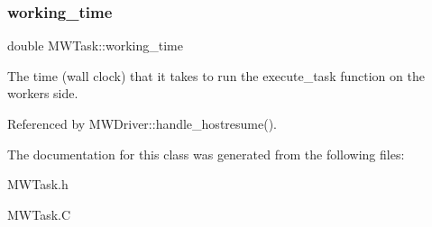 \mbox{\label{classMWTask_ae503d6480ef81dcc1ccd7927e4655226}} 
\subsubsection{\texorpdfstring{working\+\_\+time}{working\_time}}
{\footnotesize\ttfamily double M\+W\+Task\+::working\+\_\+time}

The time (wall clock) that it takes to run the \textquotesingle{}execute\+\_\+task\textquotesingle{} function on the worker\textquotesingle{}s side. 

Referenced by M\+W\+Driver\+::handle\+\_\+hostresume().



The documentation for this class was generated from the following files\+:\begin{DoxyCompactItemize}
\item 
M\+W\+Task.\+h\item 
M\+W\+Task.\+C\end{DoxyCompactItemize}
